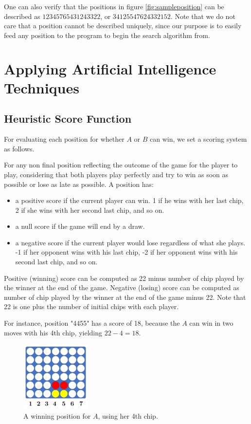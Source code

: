 \documentclass[12pt]{article}
\begin{document}
One can also verify that the positions in figure \ref{fig:sampleposition} can be described as $12345765431243322$, or $34125547624332152$. Note that we do not care that a position cannot be described uniquely, since our purpose is to easily feed any position to the program to begin the search algorithm from.

\section{Applying Artificial Intelligence Techniques}

\subsection{Heuristic Score Function}
For evaluating each position for whether $A$ or $B$ can win, we set a scoring system as follows.

For any non final position reflecting the outcome of the game for the player to play, considering that both players play perfectly and try to win as soon as possible or lose as late as possible. A position has:
\begin{itemize}
    \item a positive score if the current player can win. 1 if he wins with her last chip, 2 if she wins with her second last chip, and so on.
    \item a null score if the game will end by a draw.
    \item a negative score if the current player would lose regardless of what she plays. -1 if her opponent wins with his last chip, -2 if her opponent wins with his second last chip, and so on.
\end{itemize}

Positive (winning) score can be computed as 22 minus number of chip played by the winner at the end of the game. Negative (losing) score can be computed as number of chip played by the winner at the end of the game minus 22. Note that 22 is one plus the number of initial chips with each player.


For instance, position "4455" has a score of 18, because the $A$ can win in two moves with his 4th chip, yielding $22 - 4 = 18$.

\begin{figure}[h]
\centering
\includegraphics[width=3.5cm]{position-3.png}
\caption{A winning position for $A$, using her 4th chip.}
\end{figure}
\end{document}

